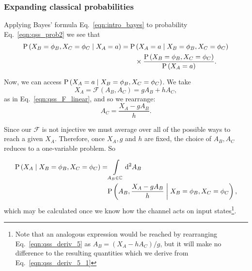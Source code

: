 




\subsubsection{Expanding classical probabilities}

Applying Bayes' formula Eq.~\ref{eqn:intro_bayes} to probability Eq.~\ref{eqn:qss_prob2} we see that
\begin{align}
\text{P}\left(X_B=\phi_B, X_C=\phi_C \; \middle| \; X_A=a\right) = \text{P}&\left(X_A=a \; \middle| \; X_B=\phi_B, X_C=\phi_C\right) \notag \\
&\times \frac{\text{P}\left(X_B=\phi_B, X_C=\phi_C\right)}{\text{P}\left(X_A=a\right)}.
\end{align}


\noindent Now, we can access $\text{P}\left(X_A=a \; \middle| \; X_B=\phi_B, X_C=\phi_C\right)$. 
We take
\begin{equation}\label{eqn:qss_deriv_5}
X_A = \mathcal{F}\left(A_B, A_C\right) = g A_B + h A_C,
\end{equation}
as in Eq.~\ref{eqn:qss_F_linear}, and so we rearrange:
\begin{equation}
A_C = \frac{X_A - g A_B}{h}.
\end{equation}

\noindent Since our $\mathcal{F}$ is not injective %
we must average over all of the possible ways to reach a given $X_A$. Therefore, once $X_A, g$ and $h$ are fixed, the choice of $A_B, A_C$ reduces to a one-variable problem. So

\begin{align}\label{eqn:qss_deriv_5_1}
\text{P}\left(X_A \; \middle| \; X_B=\phi_B, X_C=\phi_C\right) = &\int\limits_{A_B \in \mathbb{C}} \mathop{}\!\mathrm{d^2} A_B \; \notag \\
&\text{P}\left(A_B , \frac{X_A - g A_B}{h} \; \middle| \; X_B=\phi_B, X_C=\phi_C\right),
\end{align}
which may be calculated once we know how the channel acts on input states\footnote{Note that an analogous expression would be reached by rearranging Eq.~\ref{eqn:qss_deriv_5} as $A_B = \left(X_A - h A_C\right)/g$, but it will make no difference to the resulting quantities which we derive from Eq.~\ref{eqn:qss_deriv_5_1}}.


